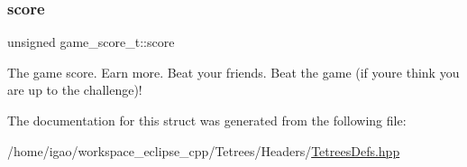 \subsubsection{\texorpdfstring{score}{score}}
{\footnotesize\ttfamily unsigned game\+\_\+score\+\_\+t\+::score}

The game score. Earn more. Beat your friends. Beat the game (if you\textquotesingle{}re think you are up to the challenge)! 

The documentation for this struct was generated from the following file\+:\begin{DoxyCompactItemize}
\item 
/home/igao/workspace\+\_\+eclipse\+\_\+cpp/\+Tetrees/\+Headers/\hyperlink{TetreesDefs_8hpp}{Tetrees\+Defs.\+hpp}\end{DoxyCompactItemize}
